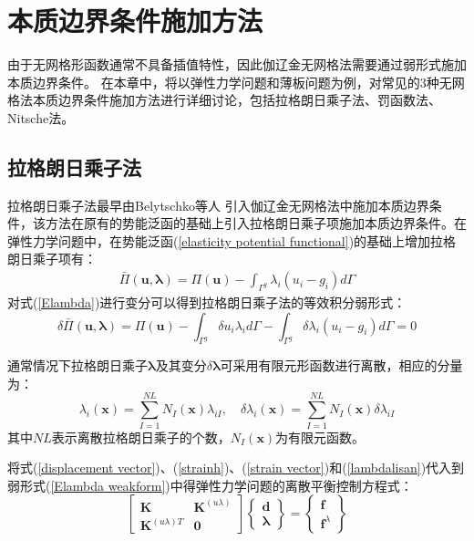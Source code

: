 \chapter{本质边界条件施加方法}
由于无网格形函数通常不具备插值特性，因此伽辽金无网格法需要通过弱形式施加本质边界条件。
在本章中，将以弹性力学问题和薄板问题为例，对常见的3种无网格法本质边界条件施加方法进行详细讨论，包括拉格朗日乘子法、罚函数法、Nitsche法。
\section{拉格朗日乘子法}
拉格朗日乘子法最早由Belytschko等人\textsuperscript{\cite{belytschko1994} }引入伽辽金无网格法中施加本质边界条件，该方法在原有的势能泛函的基础上引入拉格朗日乘子项施加本质边界条件。在弹性力学问题中，在势能泛函(\ref{elasticity potential functional})的基础上增加拉格朗日乘子项有：
\begin{equation}\label{Elambda}
\begin{split}
    \bar{\Pi}(\pmb{u},\pmb \lambda)=\Pi(\pmb{u})-\int_{\Gamma^g}\lambda_i(u_i-g_i)d\Gamma
\end{split}
\end{equation}   
对式(\ref{Elambda})进行变分可以得到拉格朗日乘子法的等效积分弱形式：
\begin{equation}\label{Elambda weakform}
        \delta\bar{\Pi}(\pmb{u},\pmb{\lambda})=\Pi(\pmb{u})-\int_{\Gamma^g}\delta u_i\lambda_id\Gamma-\int_{\Gamma^g}\delta\lambda_i(u_i-g_i)d\Gamma=0
\end{equation}\par
通常情况下拉格朗日乘子$\pmb{\lambda}$及其变分$\delta\pmb{\lambda}$可采用有限元形函数进行离散，相应的分量为：
\begin{equation}\label{lambdalisan}
\lambda_i(\pmb{x})=\sum_{I=1}^{N\!L}N_I(\pmb{x})\lambda_{iI},\quad
\delta\lambda_i(\pmb{x})=\sum_{I=1}^{N\!L}N_I(\pmb{x})\delta\lambda_{iI}
\end{equation}
其中$N\!L$表示离散拉格朗日乘子的个数，$N_I(\pmb{x})$为有限元函数。\par
将式(\ref{displacement vector})、(\ref{strainh})、(\ref{strain vector})和(\ref{lambdalisan})代入到弱形式(\ref{Elambda weakform})中得弹性力学问题的离散平衡控制方程式：
\begin{equation}
    \begin{bmatrix}\pmb{K}&\pmb{K}^{(u\lambda)}\\\pmb{K}^{(u\lambda) T}&\pmb{0}\end{bmatrix}
    \left\{\begin{matrix}\pmb{d}\\\pmb{\lambda}\end{matrix}\right\}=
    \left\{\begin{matrix}\pmb{f}\\\pmb{f}^{\lambda}\end{matrix}\right\}
\end{equation}
